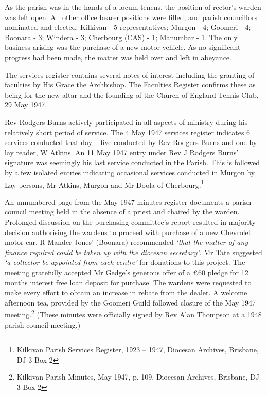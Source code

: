 As the parish was in the hands of a locum tenens, the position of rector's warden was left open. All other office bearer positions were filled, and parish councillors nominated and elected: Kilkivan - 5 representatives; Murgon - 4; Goomeri - 4; Boonara - 3; Windera - 3; Cherbourg (CAS) - 1; Manumbar - 1. The only business arising was the purchase of a new motor vehicle. As no significant progress had been made, the matter was held over and left in abeyance.



The services register contains several notes of interest including the granting of faculties by His Grace the Archbishop. The Faculties Register confirms these as being for the new altar and the founding of the Church of England Tennis Club, 29 May 1947.



Rev Rodgers Burns actively participated in all aspects of ministry during his relatively short period of service. The 4 May 1947 services register indicates 6 services conducted that day -- five conducted by Rev Rodgers Burns and one by lay reader, W Atkins. An 11 May 1947 entry under Rev J Rodgers Burns' signature was seemingly his last service conducted in the Parish. This is followed by a few isolated entries indicating occasional services conducted in Murgon by Lay persons, Mr Atkins, Murgon and Mr Doola of Cherbourg.\footnote{Kilkivan Parish Services Register, 1923 -- 1947, Diocesan Archives, Brisbane, DJ 3 Box 2}


An unnumbered page from the May 1947 minutes register documents a parish council meeting held in the absence of a priest and chaired by the warden. Prolonged discussion on the purchasing committee's report resulted in majority decision authorising the wardens to proceed with purchase of a new Chevrolet motor car. R Mander Jones' (Boonara) recommended \emph{`that the matter of any finance required could be taken up with the diocesan secretary'}. Mr Tate suggested \emph{`a collector be appointed from each centre'} for donations to this project. The meeting gratefully accepted Mr Gedge's generous offer of a \pounds60 pledge for 12 months interest free loan deposit for purchase. The wardens were requested to make every effort to obtain an increase in rebate from the dealer. A welcome afternoon tea, provided by the Goomeri Guild followed closure of the May 1947 meeting.\footnote{Kilkivan Parish Minutes, May 1947, p. 109, Diocesan Archives, Brisbane, DJ 3 Box 2} (These minutes were officially signed by Rev Alan Thompson at a 1948 parish council meeting.)


